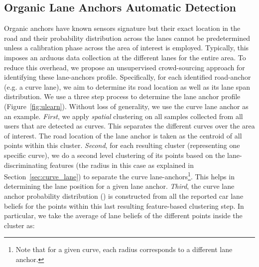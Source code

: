 \documentclass[10pt, conference, compsocconf]{IEEEtran}
\begin{document}
  \begin{table*}[!t]
  \centering
    \caption{Summary of the different testbeds used.}
      \label{tab:testbed}
  \end{table*}


\subsection{Organic Lane Anchors Automatic Detection}\label{sec:organic_update}
Organic anchors have known sensors signature but
their exact location in the road and their probability distribution across
the lanes cannot be predetermined unless a calibration phase across the area of interest is employed. Typically, this imposes an arduous data collection at the different lanes for the entire area.  To reduce this overhead, we propose an unsupervised crowd-sourcing approach for identifying these lane-anchors profile. Specifically, for each identified road-anchor (e.g. a curve lane), we aim to determine its road location as well as its lane span distribution. 
We use a three step process to determine the lane anchor profile (Figure~\ref{fig:ulearn}). Without loss of generality, we use the curve lane anchor as an example. \emph{First}, we apply \emph{spatial} clustering on all samples collected from all users that are detected as curves. This separates the different curves over the area of interest. The road location of the lane anchor is taken as the centroid of all points within this cluster. \emph{Second}, for each resulting cluster (representing one specific curve), we do a second level clustering of its points based on the lane-discriminating features (the radius in this case as explained in Section~\ref{sec:curve_lane}) to separate the curve lane-anchors\footnote{Note that for a given curve, each radius corresponds to a different lane anchor.}. This helps in determining the lane position for a given lane anchor. \emph{Third}, the curve lane anchor probability distribution () is constructed from all the reported car lane beliefs for the points within this last resulting feature-based clustering step. In particular, we take the average of lane beliefs of the different points inside the cluster as:
\end{document}
